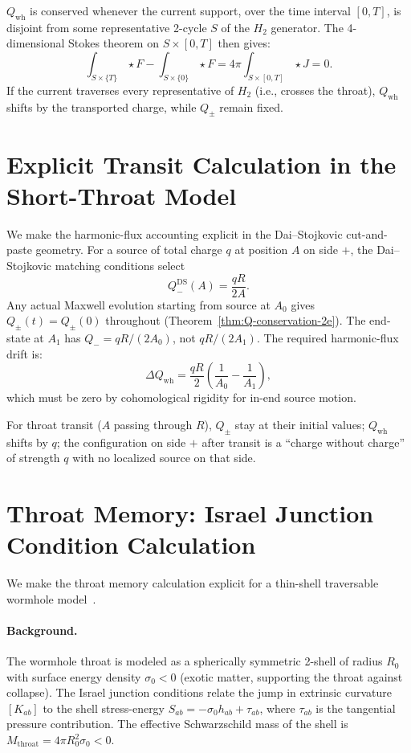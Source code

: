 \documentclass[aps,prd,onecolumn,nofootinbib,superscriptaddress]{revtex4-2}
\begin{document}
$Q_{\mathrm{wh}}$ is conserved whenever the current support, over the time
interval $[0,T]$, is disjoint from some representative 2-cycle $S$ of the
$H_2$ generator.  The 4-dimensional Stokes theorem on $S\times[0,T]$ then
gives:
\begin{equation}
  \int_{S\times\{T\}}\star F - \int_{S\times\{0\}}\star F
  = 4\pi\int_{S\times[0,T]}\star J = 0.
\end{equation}
If the current traverses every representative of $H_2$ (i.e., crosses the
throat), $Q_{\mathrm{wh}}$ shifts by the transported charge, while $Q_\pm$
remain fixed.

\section{Explicit Transit Calculation in the Short-Throat Model}
\label{app:transit}

We make the harmonic-flux accounting explicit in the Dai--Stojkovic
cut-and-paste geometry.  For a source of total charge $q$ at position $A$ on
side $+$, the Dai--Stojkovic matching conditions select
\begin{equation}
Q_-^{\mathrm{DS}}(A) = \frac{qR}{2A}.
\end{equation}
Any actual Maxwell evolution starting from source at $A_0$ gives
$Q_\pm(t)=Q_\pm(0)$ throughout (Theorem~\ref{thm:Q-conservation-2e}).  The
end-state at $A_1$ has $Q_-=qR/(2A_0)$, not $qR/(2A_1)$.  The required
harmonic-flux drift is:
\begin{equation}
\Delta Q_{\mathrm{wh}} = \frac{qR}{2}\!\left(\frac{1}{A_0}-\frac{1}{A_1}\right),
\end{equation}
which must be zero by cohomological rigidity for in-end source motion.

For throat transit ($A$ passing through $R$), $Q_\pm$ stay at their initial
values; $Q_{\mathrm{wh}}$ shifts by $q$; the configuration on side $+$ after
transit is a ``charge without charge'' of strength $q$ with no localized
source on that side.

\section{Throat Memory: Israel Junction Condition Calculation}
\label{app:israel}

We make the throat memory calculation explicit for a thin-shell traversable
wormhole model~\cite{Visser1995LorentzianWormholes}.

\paragraph{Background.}
The wormhole throat is modeled as a spherically symmetric 2-shell of radius
$R_0$ with surface energy density $\sigma_0<0$ (exotic matter, supporting the
throat against collapse).  The Israel junction conditions
relate the jump in extrinsic curvature $[K_{ab}]$ to the shell stress-energy
$S_{ab}=-\sigma_0 h_{ab}+\tau_{ab}$, where $\tau_{ab}$ is the tangential
pressure contribution.  The effective Schwarzschild mass of the shell is
$M_{\mathrm{throat}}=4\pi R_0^2 \sigma_0<0$.
\end{document}
